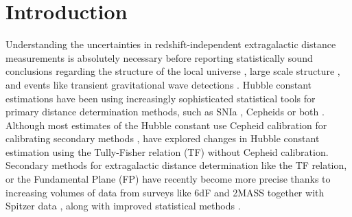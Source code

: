 \documentclass[a4paper,fleqn,usenatbib]{mnras}
\begin{document}
\section{Introduction}

Understanding the uncertainties in redshift-independent extragalactic distance measurements is absolutely necessary before reporting statistically sound conclusions regarding the structure of the local universe \citep{void,locunivcf,nongauss,6df,localunipv,said,gg3500}, large scale structure \citep{anishub,gallargescale,morphanis,tecciencia,bayesh}, and events like transient gravitational wave detections \citep{gwgallist}. Hubble constant estimations have been using increasingly sophisticated statistical tools for primary distance determination methods, such as SNIa \citep{ridsn,unity,hubsn2018}, Cepheids \citet{hubngc} or both \citep{riess}. Although most estimates of the Hubble constant use Cepheid calibration for calibrating secondary methods \citep{hubunc,huborig,hub2010}, \citet{noceph} have explored changes in Hubble constant estimation using the Tully-Fisher relation (TF) without Cepheid calibration. Secondary methods for extragalactic distance determination like the TF relation, or the Fundamental Plane (FP) have recently become more precise thanks to increasing volumes of data from surveys like 6dF \citep{6df} and 2MASS \citep{2mass,tf07dist} together with Spitzer data \citep{sorce}, along with improved statistical methods \citep{precisetf}. \\
\end{document}
